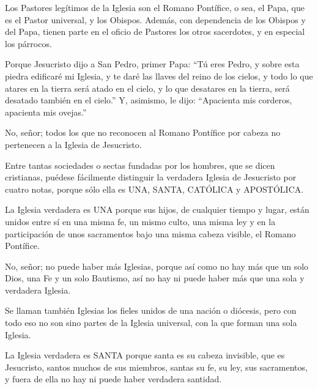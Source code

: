  Los Pastores
legítimos de la Iglesia son el Romano Pontífice, o sea, el Papa, que es el Pastor
universal, y los Obispos. Además, con dependencia de los Obispos y del Papa,
tienen parte en el oficio de Pastores los otros sacerdotes, y en especial los
párrocos.

 Porque Jesucristo dijo a San Pedro, primer Papa: “Tú eres Pedro, y
sobre esta piedra edificaré mi Iglesia, y te daré las llaves del reino de los cielos, y todo lo que atares en la tierra será atado en el cielo, y lo que desatares en la tierra, será desatado también en el cielo.” Y, asimismo, le dijo: “Apacienta mis corderos, apacienta mis ovejas.”

No, señor; todos los que no reconocen al Romano Pontífice por cabeza no
pertenecen a la Iglesia de Jesucristo.

Entre tantas sociedades o sectas fundadas por los hombres, que se dicen
cristianas, puédese fácilmente distinguir la verdadera Iglesia de Jesucristo por
cuatro notas, porque sólo ella es UNA, SANTA, CATÓLICA y APOSTÓLICA.

 La Iglesia verdadera es UNA
porque sus hijos, de cualquier tiempo y lugar, están unidos entre sí en una misma
fe, un mismo culto, una misma ley y en la participación de unos sacramentos bajo
una misma cabeza visible, el Romano Pontífice.

 No, señor; no puede haber más Iglesias,
porque así como no hay más que un solo Dios, una Fe y un solo Bautismo, así no
hay ni puede haber más que una sola y verdadera Iglesia.

 Se llaman también Iglesias los fieles unidos de una nación o diócesis,
pero con todo eso no son sino partes de la Iglesia universal, con la que forman
una sola Iglesia.

 La Iglesia verdadera es
SANTA porque santa es su cabeza invisible, que es Jesucristo, santos muchos de
sus miembros, santas su fe, su ley, sus sacramentos, y fuera de ella no hay ni
puede haber verdadera santidad.

